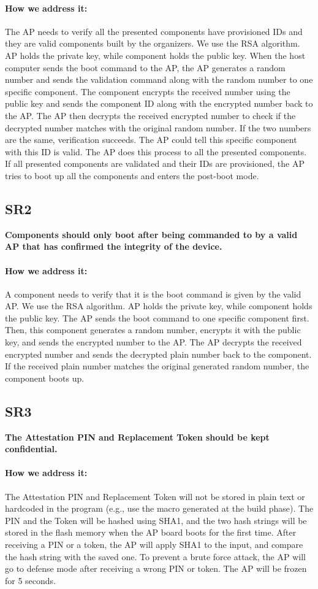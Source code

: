 \documentclass[11pt,oneside,onecolumn,letterpaper]{article}
\newcounter{alg}
\begin{document}
\paragraph{How we address it:}
The AP needs to verify all the presented components have provisioned IDs and they are valid components built by the organizers.
We use the RSA algorithm.
AP holds the private key,
while component holds the public key.
When the host computer sends the boot command to the AP,
the AP generates a random number and sends the validation command along with the random number to one specific component.
The component encrypts the received number using the public key and sends the component ID along with the encrypted number back to the AP.
The AP then decrypts the received encrypted number to check if the decrypted number matches with the original random number.
If the two numbers are the same,
verification succeeds.
The AP could tell this specific component with this ID is valid.
The AP does this process to all the presented components.
If all presented components are validated and their IDs are provisioned,
the AP tries to boot up all the components and enters the post-boot mode.

\subsection{SR2}
\textbf{Components should only boot after being commanded to by a valid AP that has confirmed the integrity of the device.}
\paragraph{How we address it:}
A component needs to verify that it is the boot command is given by the valid AP.
We use the RSA algorithm.
AP holds the private key,
while component holds the public key.
The AP sends the boot command to one specific component first.
Then,
this component generates a random number,
encrypts it with the public key,
and sends the encrypted number to the AP.
The AP decrypts the received encrypted number and sends the decrypted plain number back to the component.
If the received plain number matches the original generated random number,
the component boots up.

\subsection{SR3}
\textbf{The Attestation PIN and Replacement Token should be kept confidential.}
\paragraph{How we address it:}
The Attestation PIN and Replacement Token will not be stored in plain text or hardcoded in the program (e.g., use the macro generated at the build phase).
The PIN and the Token will be hashed using SHA1,
and the two hash strings will be stored in the flash memory when the AP board boots for the first time.
After receiving a PIN or a token,
the AP will apply SHA1 to the input,
and compare the hash string with the saved one.
To prevent a brute force attack,
the AP will go to defense mode after receiving a wrong PIN or token.
The AP will be frozen for 5 seconds.
\end{document}
